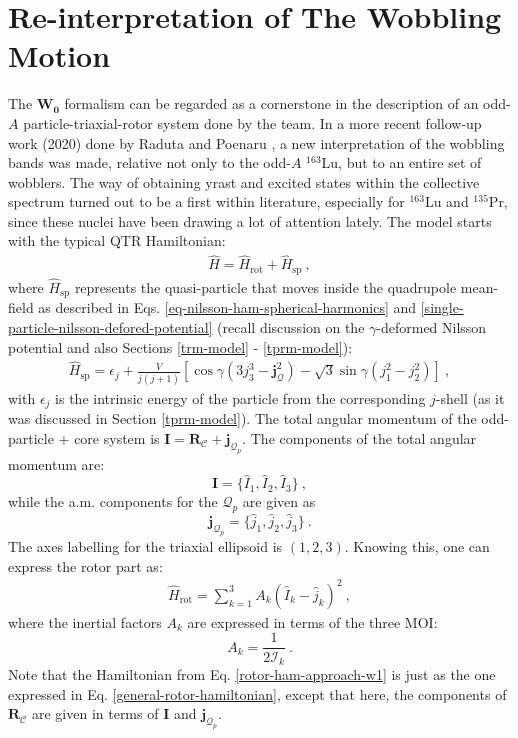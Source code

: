 \section{Re-interpretation of The Wobbling Motion}

The $\mathbf{W_0}$ formalism can be regarded as a cornerstone in the description of an odd-$A$ particle-triaxial-rotor system done by the team. In a more recent follow-up work (2020) done by Raduta and Poenaru \cite{raduta2020approach,raduta2020towards}, a new interpretation of the wobbling bands was made, relative not only to the odd-$A$ $^{163}$Lu, but to an entire set of wobblers. The way of obtaining yrast and excited states within the collective spectrum turned out to be a first within literature, especially for $^{163}$Lu and $^{135}$Pr, since these nuclei have been drawing a lot of attention lately. The model starts with the typical QTR Hamiltonian:
\begin{align}
    \hat{H}=\hat{H}_\text{rot}+\hat{H}_\text{sp}\ ,
    \label{total-ham-approach-w1}
\end{align}
where $\hat{H}_\text{sp}$ represents the quasi-particle that moves inside the quadrupole mean-field as described in Eqs. \ref{eq-nilsson-ham-spherical-harmonics} and \ref{single-particle-nilsson-defored-potential} (recall discussion on the $\gamma$-deformed Nilsson potential and also Sections \ref{trm-model} - \ref{tprm-model}):
\begin{align}
    \hat{H}_\text{sp}=\epsilon_j+\frac{V}{j(j+1)}\left[\cos\gamma\left(3j_3^3-\mathbf{j}_\mathcal{Q}^2\right)-\sqrt{3}\sin\gamma\left(j_1^2-j_2^2\right)\right]\ ,
    \label{single-particle-ham-approach-w1}
\end{align}
with $\epsilon_j$ is the intrinsic energy of the particle from the corresponding $j$-shell (as it was discussed in Section \ref{tprm-model}). The total angular momentum of the odd-particle + core system is $\mathbf{I}=\mathbf{R}_\mathscr{C}+\mathbf{j}_{\mathcal{Q}_p}$. The components of the total angular momentum are: $$\mathbf{I}=\{\hat{I}_1,\hat{I}_2,\hat{I}_3\}\ ,$$ while the a.m. components for the $\mathcal{Q}_p$ are given as $$\mathbf{j}_{\mathcal{Q}_p}=\{\hat{j}_1,\hat{j}_2,\hat{j}_3\}\ .$$ The axes labelling for the triaxial ellipsoid is $(1,2,3)$. Knowing this, one can express the rotor part as:
\begin{align}
    \hat{H}_\text{rot}=\sum_{k=1}^3A_k(\hat{I}_k-\hat{j}_k)^2\ ,
    \label{rotor-ham-approach-w1}
\end{align}
where the inertial factors $A_k$ are expressed in terms of the three MOI:$$A_k=\frac{1}{2\mathcal{I}_k}\ .$$
Note that the Hamiltonian from Eq. \ref{rotor-ham-approach-w1} is just as the one expressed in Eq. \ref{general-rotor-hamiltonian}, except that here, the components of $\mathbf{R}_\mathscr{C}$ are given in terms of $\mathbf{I}$ and $\mathbf{j}_{\mathcal{Q}_p}$.

